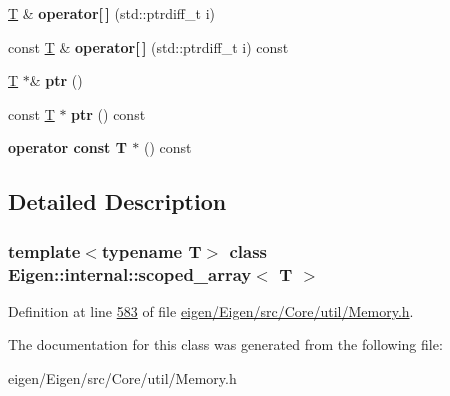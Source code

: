 \begin{DoxyCompactItemize}
\hyperlink{group___sparse_core___module}{T} \& {\bfseries operator\mbox{[}$\,$\mbox{]}} (std\+::ptrdiff\+\_\+t i)
\item 
\mbox{\label{class_eigen_1_1internal_1_1scoped__array_aab88c47f00a9b3522fe60793d18f1e17}} 
const \hyperlink{group___sparse_core___module}{T} \& {\bfseries operator\mbox{[}$\,$\mbox{]}} (std\+::ptrdiff\+\_\+t i) const
\item 
\mbox{\label{class_eigen_1_1internal_1_1scoped__array_a53e524d42e288b9117a59f5aded705dd}} 
\hyperlink{group___sparse_core___module}{T} $\ast$\& {\bfseries ptr} ()
\item 
\mbox{\label{class_eigen_1_1internal_1_1scoped__array_a612b4dec5cb49f476918c94ef4901623}} 
const \hyperlink{group___sparse_core___module}{T} $\ast$ {\bfseries ptr} () const
\item 
\mbox{\label{class_eigen_1_1internal_1_1scoped__array_a0806589a4a7087c0ee02f6e748675e00}} 
{\bfseries operator const T $\ast$} () const
\end{DoxyCompactItemize}


\subsection{Detailed Description}
\subsubsection*{template$<$typename T$>$\newline
class Eigen\+::internal\+::scoped\+\_\+array$<$ T $>$}



Definition at line \hyperlink{eigen_2_eigen_2src_2_core_2util_2_memory_8h_source_l00583}{583} of file \hyperlink{eigen_2_eigen_2src_2_core_2util_2_memory_8h_source}{eigen/\+Eigen/src/\+Core/util/\+Memory.\+h}.



The documentation for this class was generated from the following file\+:\begin{DoxyCompactItemize}
\item 
eigen/\+Eigen/src/\+Core/util/\+Memory.\+h\end{DoxyCompactItemize}
